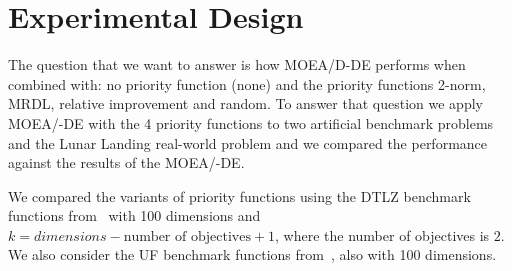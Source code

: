 \section{Experimental Design}

%


The question that we want to answer is how MOEA/D-DE performs when combined with: no priority function (none) and the priority functions 2-norm, MRDL, relative improvement and random. To answer that question we apply MOEA/-DE with the 4 priority functions to two artificial benchmark problems and the Lunar Landing real-world problem and we compared the performance against the results of the MOEA/-DE.


We compared the variants of priority functions using the DTLZ benchmark functions from~\cite{deb2005scalable} with 100 dimensions and $k = dimensions - \text{number of objectives} + 1$, where the number of objectives is $2$. We also consider the UF benchmark functions from~\cite{zhang2008multiobjective}, also with 100 dimensions. 




